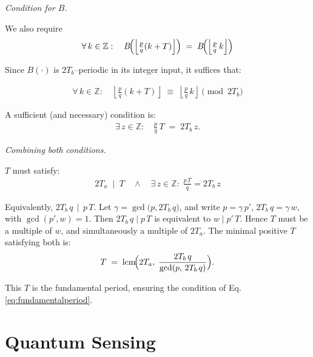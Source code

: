 \textit{Condition for $B$.}

We also require
\begin{align}
  \forall\,k \in \mathbb{Z}
  :\quad
  B\!\Bigl(\left\lfloor \tfrac{p}{q}(k+T)\right\rfloor\Bigr)
  \;=\;
  B\!\Bigl(\left\lfloor \tfrac{p}{q}\,k\right\rfloor\Bigr)
\end{align}

Since $B(\cdot)$ is $2T_b$--periodic in its integer input, it suffices that:

\begin{align}
    \forall\,k \in \mathbb{Z}: \quad
    \left\lfloor \tfrac{p}{q}(k+T)\right\rfloor 
    \;\equiv\;
    \left\lfloor \tfrac{p}{q}\,k\right\rfloor
    \pmod{2T_b}
\end{align}

A sufficient (and necessary) condition is:
\begin{align}
  \exists\,z \in \mathbb{Z}
  :\quad
  \frac{p}{q}\,T 
  \;=\;
  2T_b\,z.
\end{align}

\textit{Combining both conditions.}

$T$ must satisfy:
\begin{align}
   2T_a \;\mid\; T
   \quad\wedge\quad
   \exists\,z \in \mathbb{Z}
   :\;
   \frac{p\,T}{q} = 2T_b\,z
\end{align}

Equivalently, $2T_b\,q \,\mid\, p\,T$. Let $\gamma = \gcd\!\bigl(p,2T_b\,q\bigr)$, and write $p = \gamma\,p'$, $2T_b\,q = \gamma\,w$, with $\gcd(p',w)=1$. Then $2T_b\,q \mid p\,T$ is equivalent to $w \mid p'\,T$. Hence $T$ must be a multiple of $w$, and simultaneously a multiple of $2T_a$. The minimal positive $T$ satisfying both is:
\begin{align}
    T 
    \;=\;
    \mathrm{lcm}\!\Bigl(
      2T_a,
      \;\frac{2T_b\,q}{\gcd(p,\,2T_b\,q)}
    \Bigr).
\end{align}

This $T$ is the fundamental period, ensuring the condition of Eq. \ref{eq:fundamentalperiod}.





\section{Quantum Sensing}

